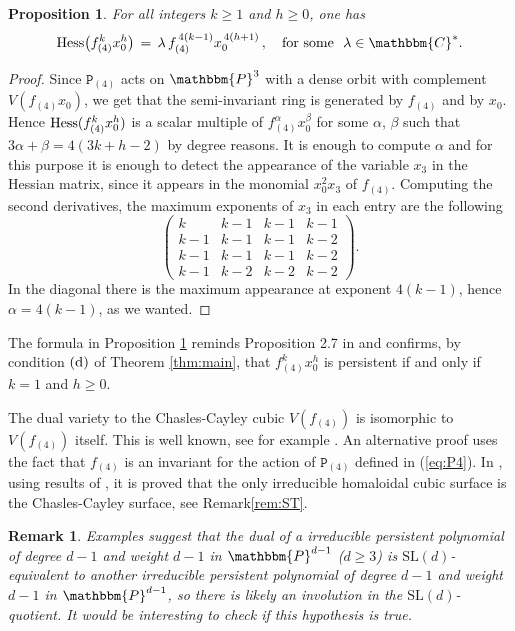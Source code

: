 \documentclass[aps,floatfix,groupedaddress,superscriptaddress,longbibliography,footinbib,notitlepage,showpacs]{revtex4-1}
\def\Hess{{\rm Hess}}
\newtheorem{remark}[theorem]{Remark}
\newtheorem{proposition}[theorem]{Proposition}
\begin{document}
\begin{proposition}\label{prop:f4khess}
For all integers $k \geq 1$ and $h \geq 0$, one has
\begin{equation}
\Hess\big(f_{(4)}^k x_0^h\big)\,=\,\lambda \, f_{(4)}^{\,4(k-1)} x_0^{\,4(h+1)}\,, \quad \text{for some}~~\lambda \in \mathbbm{C}^*.
\end{equation}
\end{proposition}
\begin{proof}
Since $\mathtt{P}_{(4)}$ acts on $\mathbbm{P}^3$
with a dense orbit with complement $V(f_{(4)}x_0)$, we get that the semi-invariant ring is generated by $f_{(4)}$ and by $x_0$.
Hence $\Hess(f_{(4)}^kx_0^h)$ is a scalar multiple of $f_{(4)}^\alpha x_0^\beta$ for some $\alpha$, $\beta$ such that
$3\alpha+\beta=4(3k+h-2)$ by degree reasons.
It is enough to compute $\alpha$ and for this purpose it is enough to detect the appearance of
the variable $x_3$ in the Hessian matrix, since
it appears in the monomial $x_0^2x_3$ of $f_{(4)}$. Computing the second derivatives, the maximum exponents of $x_3$ in each entry are the following
\begin{equation}
\begin{pmatrix}
k&k-1&k-1&k-1\\
k-1&k-1&k-1&k-2\\
k-1&k-1&k-1&k-2\\
k-1&k-2&k-2&k-2\end{pmatrix}.
\end{equation}
In the diagonal there is the maximum appearance at exponent $4(k-1)$, hence $\alpha=4(k-1)$, as we wanted.
\end{proof}
The formula in Proposition \ref{prop:f4khess} reminds Proposition 2.7 in \cite{COCDR} and confirms, by condition $(\textnormal{d})$ of Theorem \ref{thm:main}, that $f_{(4)}^kx_0^h$ is persistent if and only if $k=1$ and $h\geq 0$.

The dual variety to the Chasles-Cayley cubic $V(f_{(4)})$ is isomorphic to $V(f_{(4)})$ itself. This is well known, see for example \cite[Proposition 1.7]{CRS}. An alternative proof
uses the fact that $f_{(4)}$ is an invariant for the action of $\mathtt{P}_{(4)}$ defined in (\ref{eq:P4}). In \cite{ST}, using results of \cite{DP, Huh}, it is proved that the only irreducible homaloidal cubic surface is the Chasles-Cayley surface, see Remark\ref{rem:ST}.

\begin{remark}
Examples suggest that the dual of a irreducible persistent polynomial of degree $d-1$ and weight $d-1$ in $\mathbbm{P}^{d-1}$ ($d\geq 3$)
is $\mathrm{SL}(d)$-equivalent to another irreducible persistent polynomial of degree $d-1$ and weight $d-1$ in $\mathbbm{P}^{d-1}$, so there is likely an involution in the $\mathrm{SL}(d)$-quotient. It would be interesting to check if this hypothesis is true.
\end{remark}
\end{document}

